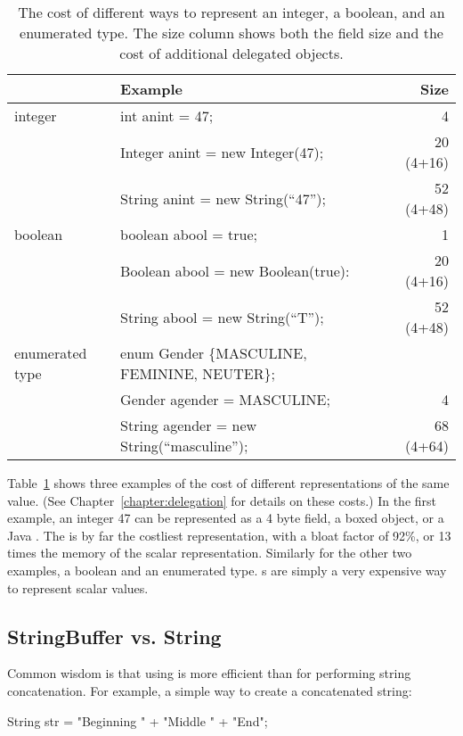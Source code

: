 \begin{table}
  \centering
\begin{tabular}{llr} \toprule \toprule
& Example & Size \\ \midrule \midrule
integer & int anint = 47; & 4 \\
\midrule
& Integer anint = new Integer(47); & 20 (4+16)  \\
\midrule
& String anint = new String(``47''); & 52 (4+48) \\
\midrule
\midrule
boolean & boolean abool = true; & 1\\
\midrule
& Boolean abool = new Boolean(true): & 20 (4+16) \\
\midrule
& String abool = new String(``T''); & 52 (4+48) \\
\midrule \midrule
enumerated type & enum Gender \{MASCULINE, FEMININE, NEUTER\}; &\\
& Gender agender = MASCULINE; & 4 \\
\midrule
& String agender = new String(``masculine''); & 68 (4+64) \\
\bottomrule \bottomrule
\end{tabular}
\caption{The cost of different ways to represent an integer, a boolean, and an
enumerated type. The size column shows both the field size and the cost of
additional delegated objects.}
\label{tab:data-sizes}
\end{table}

Table~\ref{tab:data-sizes} shows three examples of the cost of different
representations of the same value. (See Chapter~\ref{chapter:delegation} for
details on these costs.) In the first example, an integer 47 can be
represented as a 4 byte field, a boxed object, or a Java . 
The  is by far the costliest representation, with a bloat factor of
92\%, or 13 times the memory of the scalar representation.  Similarly for the other two examples, a
boolean and an enumerated type.
s are simply a very expensive way to represent scalar values.

\subsection{StringBuffer vs. String}

Common wisdom is that using  is more efficient than
 for performing string concatenation. For example, a simple way
to create a concatenated string:

\begin{shortlisting}
	String str = "Beginning  " + "Middle " +  "End";
\end{shortlisting}

